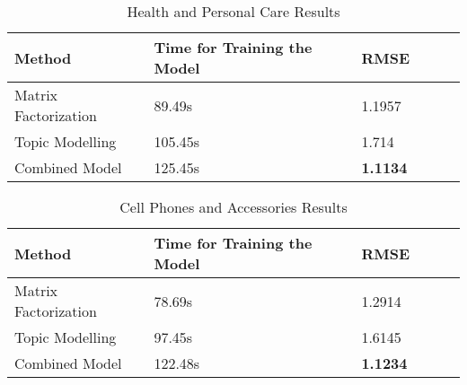 \documentclass[10pt,conference]{IEEEtran}
\begin{document}
\begin{table}[h]
\centering
\caption{Health and Personal Care Results}
\label{Health and Personal Care Results}
\begin{tabular}{ llllll }
\toprule
\textbf{Method} & \textbf{Time for Training the Model} & \textbf{RMSE} \\
\midrule
Matrix Factorization & 89.49s & 1.1957 \\
\hline
Topic Modelling & 105.45s & 1.714 \\
\hline
Combined Model & 125.45s  & \textbf{1.1134} \\ 
\bottomrule
\end{tabular}
\end{table}


\begin{table}[h]
\centering
\caption{Cell Phones and Accessories Results}\label{Cell Phones and Accessories Results}
\begin{tabular}{ llllll }
\toprule
\textbf{Method} & \textbf{Time for Training the Model} & \textbf{RMSE} \\
\midrule
Matrix Factorization & 78.69s & 1.2914 \\
\hline
Topic Modelling & 97.45s & 1.6145 \\
\hline
Combined Model & 122.48s  & \textbf{1.1234} \\ 
\bottomrule        
\end{tabular}
\end{table}
\end{document}
